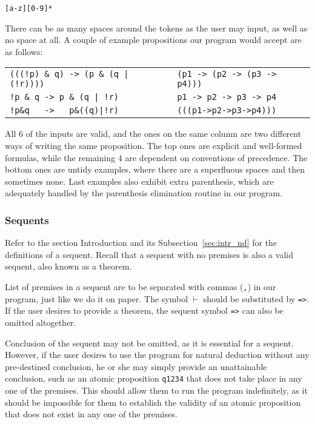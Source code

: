\documentclass{article}
\begin{document}
\begin{center}
\verb|[a-z][0-9]*|
\end{center}

There can be as many spaces around the tokens as the user may input,
as well as no space at all. A couple of example propositions our program
would accept are as follows:

\begin{center}
	\begin{tabular}{l | l}
		\verb^(((!p) & q) -> (p & (q | (!r))))^ & \verb^(p1 -> (p2 -> (p3 -> p4)))^\\
		\verb^!p & q -> p & (q | !r)^           & \verb^p1 -> p2 -> p3 -> p4^\\
		\verb^!p&q   ->   p&((q)|!r)^           & \verb^(((p1->p2->p3->p4)))^
	\end{tabular}
\end{center}

All 6 of the inputs are valid, and the ones on the same column are
two different ways of writing the same proposition. The top ones are
explicit and well-formed formulas, while the remaining 4 are dependent
on conventions of precedence. The bottom ones are untidy examples, where
there are a superfluous spaces and then sometimes none. Last examples
also exhibit extra parenthesis, which are adequately handled by the
parenthesis elimination routine in our program.

\subsubsection{Sequents}

Refer to the section Introduction and its Subsection~\ref{sec:intr_nd}
for the definitions of a sequent. Recall that a sequent with no premises
is also a valid sequent, also known as a theorem.

List of premises in a sequent are to be separated with commas (\verb|,|)
in our program, just like we do it on paper. The symbol $\vdash$ should
be substituted by \verb|=>|.  If the user desires to provide a theorem,
the sequent symbol \verb|=>| can also be omitted altogether.

Conclusion of the sequent may not be omitted, as it is essential for a
sequent. However, if the user desires to use the program for natural deduction
without any pre-destined conclusion, he or she may simply provide an unattainable
conclusion, such as an atomic proposition \verb|q1234| that does not take place
in any one of the premises. This should allow them to run the program
indefinitely, as it should be impossible for them to establish the validity
of an atomic proposition that does not exist in any one of the premises.
\end{document}

